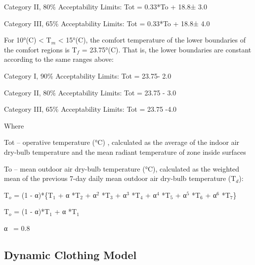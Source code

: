 Category II, 80\% Acceptability Limits: Tot = 0.33*To + 18.8± 3.0

Category III, 65\% Acceptability Limits: Tot = 0.33*To + 18.8± 4.0

For 10°(C) \textless{} T\(_{m}\) \textless{} 15°(C), the comfort temperature of the lower boundaries of the comfort regions is T\(_{f}\) = 23.75°(C). That is, the lower boundaries are constant according to the same ranges above:

Category I, 90\% Acceptability Limits: Tot = 23.75- 2.0

Category II, 80\% Acceptability Limits: Tot = 23.75 - 3.0

Category III, 65\% Acceptability Limits: Tot = 23.75 -4.0

Where

Tot -- operative temperature (°C) , calculated as the average of the indoor air dry-bulb temperature and the mean radiant temperature of zone inside surfaces

To -- mean outdoor air dry-bulb temperature (°C), calculated as the weighted mean of the previous 7-day daily mean outdoor air dry-bulb temperature (T\(_{d}\)):

T\(_{o}\) = (1 - α)*\{T\(_{1}\) + α *T\(_{2}\) + α\(^{2}\) *T\(_{3}\) + α\(^{3}\) *T\(_{4}\) + α\(^{4}\) *T\(_{5}\) + α\(^{5}\) *T\(_{6}\) + α\(^{6}\) *T\(_{7}\)\}

T\(_{o}\) = (1 - α)*T\(_{1}\) + α *T\(_{1}\)

α~ = 0.8

\subsection{Dynamic Clothing Model}\label{dynamic-clothing-model}

